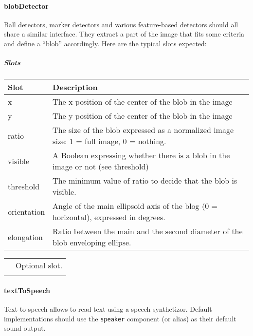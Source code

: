 \documentclass[a4paper]{article}
\begin{document}
\paragraph{blobDetector}


Ball detectors, marker detectors and various feature-based detectors
should all share a similar interface. They extract a part of the image
that fits some criteria and define a “blob” accordingly. Here are the
typical slots expected:

\subparagraph{Slots}

\begin{flushleft}
\tablehead{}
\begin{supertabular}{|m{3.293cm}|m{11.997cm}|}
\hline
\sffamily\bfseries Slot &
\sffamily\bfseries Description\\\hline
x &
\sffamily The x position of the center of the
blob in the image\\\hline
y &
\sffamily The y position of the center of the
blob in the image\\\hline
ratio &
\sffamily The size of the blob expressed as a
normalized image size: 1 = full image, 0 = nothing.\\\hline
visible &
A Boolean expressing whether there is a
blob in the image or not (see threshold)\\\hline
threshold &
The minimum value of ratio to
decide that the blob is visible.\\\hline
orientation &
\sffamily Angle of the main ellipsoid axis of
the blog (0 = horizontal), expressed in degrees.\\\hline
elongation &
\sffamily Ratio between the main and the second
diameter of the blob enveloping ellipse.\\\hline
\end{supertabular}
\end{flushleft}
\begin{flushleft}
\tablehead{}
\begin{supertabular}{|m{1.717cm}|m{10.464cm}}
\hhline{-~}
 &
\sffamily Optional slot.\\\hhline{-~}
\end{supertabular}
\end{flushleft}
\paragraph{textToSpeech}


Text to speech allows to read text using a speech synthetizor. Default
implementations should use the \texttt{speaker} component (or alias) as
their default sound output.
\end{document}
